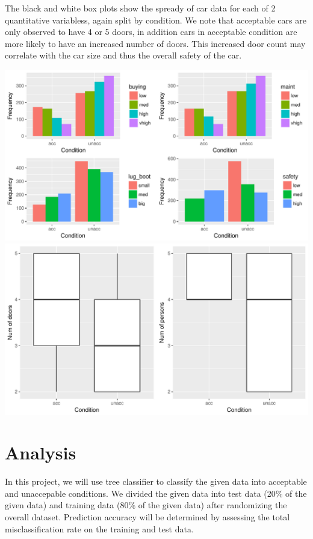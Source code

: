 \documentclass[]{article}
\begin{document}
The black and white box plots show the spready of car data for each of 2
quantitative variabless, again split by condition. We note that
acceptable cars are only observed to have 4 or 5 doors, in addition cars
in acceptable condition are more likely to have an increased number of
doors. This increased door count may correlate with the car size and
thus the overall safety of the car.

\includegraphics{Project3_files/figure-latex/EDA - Fei-1.pdf}
\includegraphics{Project3_files/figure-latex/EDA - Fei-2.pdf}

\section{Analysis}\label{analysis}

In this project, we will use tree classifier to classify the given data
into acceptable and unaccepable conditions. We divided the given data
into test data (20\% of the given data) and training data (80\% of the
given data) after randomizing the overall dataset. Prediction accuracy
will be determined by assessing the total misclassification rate on the
training and test data.
\end{document}
